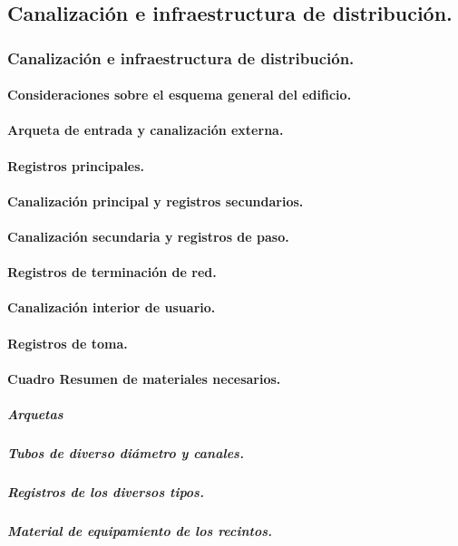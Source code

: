 \subsection{Canalización e infraestructura de distribución.}
\subsubsection{Canalización e infraestructura de distribución.}
\paragraph{Consideraciones sobre el esquema general del edificio.}
\paragraph{Arqueta de entrada y canalización externa.}
\paragraph{Registros principales.}
\paragraph{Canalización principal y registros secundarios.}
\paragraph{Canalización secundaria y registros de paso.}
\paragraph{Registros de terminación de red.}
\paragraph{Canalización interior de usuario.}
\paragraph{Registros de toma.}
\paragraph{Cuadro Resumen de materiales necesarios.}
\subparagraph{Arquetas}
\subparagraph{Tubos de diverso diámetro y canales.}
\subparagraph{Registros de los diversos tipos.}
\subparagraph{Material de equipamiento de los recintos.}